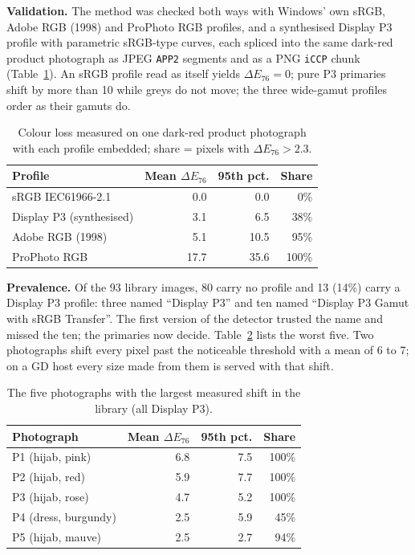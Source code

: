 \documentclass[sigconf,nonacm,screen]{acmart}
\begin{document}
\textbf{Validation.} The method was checked both ways with Windows' own sRGB, Adobe RGB (1998) and ProPhoto RGB profiles, and a synthesised Display P3 profile with parametric sRGB-type curves, each spliced into the same dark-red product photograph as JPEG \texttt{APP2} segments and as a PNG \texttt{iCCP} chunk (Table~\ref{tab:validation}). An sRGB profile read as itself yields $\Delta E_{76}=0$; pure P3 primaries shift by more than 10 while greys do not move; the three wide-gamut profiles order as their gamuts do.

\begin{table}[t]
\caption{Colour loss measured on one dark-red product photograph with each profile embedded; share = pixels with $\Delta E_{76} > 2.3$.}
\label{tab:validation}
\small
\begin{tabular}{@{}lrrr@{}}
\toprule
Profile & Mean $\Delta E_{76}$ & 95th pct. & Share \\
\midrule
sRGB IEC61966-2.1 & 0.0 & 0.0 & 0\% \\
Display P3 (synthesised) & 3.1 & 6.5 & 38\% \\
Adobe RGB (1998) & 5.1 & 10.5 & 95\% \\
ProPhoto RGB & 17.7 & 35.6 & 100\% \\
\bottomrule
\end{tabular}
\end{table}

\textbf{Prevalence.} Of the 93 library images, 80 carry no profile and 13 (14\%) carry a Display P3 profile: three named ``Display P3'' and ten named ``Display P3 Gamut with sRGB Transfer''. The first version of the detector trusted the name and missed the ten; the primaries now decide. Table~\ref{tab:library} lists the worst five. Two photographs shift every pixel past the noticeable threshold with a mean of 6 to 7; on a GD host every size made from them is served with that shift.

\begin{table}[t]
\caption{The five photographs with the largest measured shift in the library (all Display P3).}
\label{tab:library}
\small
\begin{tabular}{@{}lrrr@{}}
\toprule
Photograph & Mean $\Delta E_{76}$ & 95th pct. & Share \\
\midrule
P1 (hijab, pink) & 6.8 & 7.5 & 100\% \\
P2 (hijab, red) & 5.9 & 7.7 & 100\% \\
P3 (hijab, rose) & 4.7 & 5.2 & 100\% \\
P4 (dress, burgundy) & 2.5 & 5.9 & 45\% \\
P5 (hijab, mauve) & 2.5 & 2.7 & 94\% \\
\bottomrule
\end{tabular}
\end{table}
\end{document}
